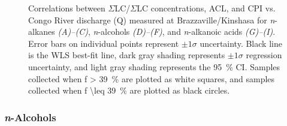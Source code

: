 \begin{figure}[p]
	\caption[Correlations between concentration, ACL, CPI, and discharge]{Correlations between $\Sigma$LC/$\Sigma$LC concentrations, ACL, and CPI vs. Congo River discharge (Q) measured at Brazzaville/Kinshasa for \textit{n}-alkanes \textit{(A)--(C)}, \textit{n}-alcohols \textit{(D)--(F)}, and \textit{n}-alkanoic acids \textit{(G)--(I)}. Error bars on individual points represent $\pm 1 \sigma$ uncertainty. Black line is the WLS best-fit line, dark gray shading represents $\pm 1 \sigma$  regression uncertainty, and light gray shading represents the \SI{95}{\%} CI. Samples collected when f \SI{> 39}{\%} are plotted as white squares, and samples collected when f \SI{\leq 39}{\%} are plotted as black circles.}
	\label{Ch4Fig:5} 
\end{figure}

\subsubsection{\textit{n}-Alcohols}


